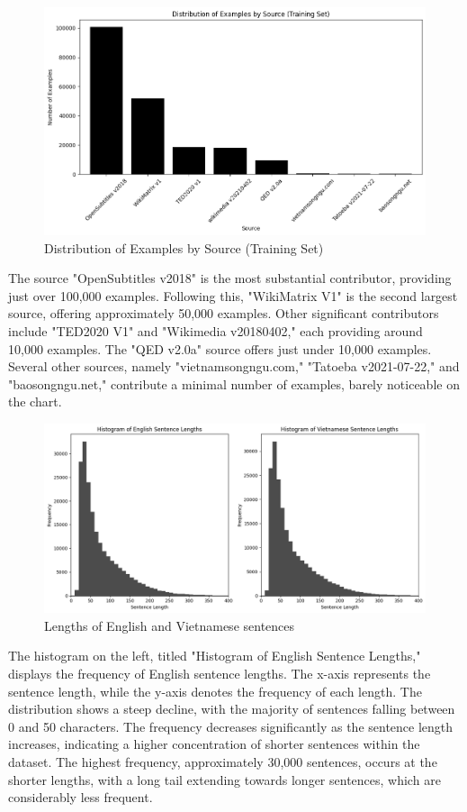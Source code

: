 \documentclass{article}
\begin{document}
\begin{figure}[H]
    \centering
    \includegraphics[width=1\textwidth]{figs/source.png} 
    \caption{Distribution of Examples by Source (Training Set)}
\end{figure}
The source "OpenSubtitles v2018" is the most substantial contributor, providing just over 100,000 examples. Following this, "WikiMatrix V1" is the second largest source, offering approximately 50,000 examples. Other significant contributors include "TED2020 V1" and "Wikimedia v20180402," each providing around 10,000 examples. The "QED v2.0a" source offers just under 10,000 examples. Several other sources, namely "vietnamsongngu.com," "Tatoeba v2021-07-22," and "baosongngu.net," contribute a minimal number of examples, barely noticeable on the chart.

\begin{figure}[H]
    \centering
    \includegraphics[width=1\textwidth]{figs/histogram.png}
    \caption{Lengths of English and Vietnamese sentences}
\end{figure}
The histogram on the left, titled "Histogram of English Sentence Lengths," displays the frequency of English sentence lengths. The x-axis represents the sentence length, while the y-axis denotes the frequency of each length. The distribution shows a steep decline, with the majority of sentences falling between 0 and 50 characters. The frequency decreases significantly as the sentence length increases, indicating a higher concentration of shorter sentences within the dataset. The highest frequency, approximately 30,000 sentences, occurs at the shorter lengths, with a long tail extending towards longer sentences, which are considerably less frequent.
\end{document}
